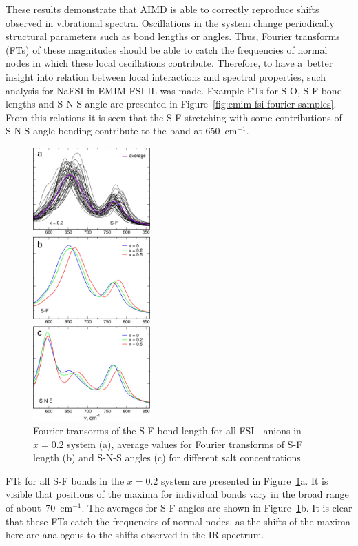 These results demonstrate that AIMD is able to correctly reproduce shifts observed in vibrational spectra. Oscillations in the system change periodically structural parameters such as bond lengths or angles. Thus, Fourier transforms (FTs) of these magnitudes should be able to catch the frequencies of normal nodes in which these local oscillations contribute. Therefore, to have a~better insight into relation between local interactions and spectral properties, such analysis for NaFSI in EMIM-FSI IL was made. Example FTs for S-O, S-F bond lengths and S-N-S angle are presented in Figure~\ref{fig:emim-fsi-fourier-samples}. From this relations it is seen that the S-F stretching with some contributions of S-N-S angle bending contribute to the band at 650~cm$^{-1}$.

\begin{figure}[ht]
    \centering
    \includegraphics[width=0.4\textwidth]{img/4-ir-spectra-from-aimd-simulations/1-emim-fsi/fourier-individual.png}
    \caption{Fourier transorms of the S-F bond length for all FSI$^{-}$ anions in $x = 0.2$ system (a), average values for Fourier transforms of S-F length (b) and S-N-S angles (c) for different salt concentrations}
    \label{fig:emim-fsi-fourier-individual}
\end{figure}

FTs for all S-F bonds in the $x = 0.2$ system are presented in Figure~\ref{fig:emim-fsi-fourier-individual}a. It is visible that positions of the maxima for individual bonds vary in the broad range of about~70~cm$^{-1}$. The averages for S-F angles are shown in Figure~\ref{fig:emim-fsi-fourier-individual}b. It is clear that these FTs catch the frequencies of normal nodes, as the shifts of the maxima here are analogous to the shifts observed in the IR spectrum.



